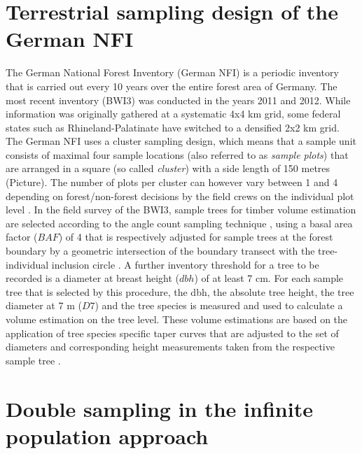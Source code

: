 

\section{Terrestrial sampling design of the German NFI}
\label{sec:germanNFI}

The German National Forest Inventory (German NFI) is a periodic inventory that is carried out every 10 years over the entire forest area of Germany. The most recent inventory (BWI3) was conducted in the years 2011 and 2012. While information was originally gathered at a systematic 4x4 km grid, some federal states such as Rhineland-Palatinate have switched to a densified 2x2 km grid. The German NFI uses a cluster sampling design, which means that a sample unit consists of maximal four sample locations (also referred to as \textit{sample plots}) that are arranged in a square (so called \textit{cluster}) with a side length of 150 metres (Picture). The number of plots per cluster can however vary between 1 and 4 depending on forest/non-forest decisions by the field crews on the individual plot level \citep{bwi3_aufn}. In the field survey of the BWI3, sample trees for timber volume estimation are selected according to the angle count sampling technique \citep{bitterlich1984}, using a basal area factor ($BAF$) of 4 that is respectively adjusted for sample trees at the forest boundary by a geometric intersection of the boundary transect with the tree-individual inclusion circle \citep{bwi3_aufn}. A further inventory threshold for a tree to be recorded is a diameter at breast height ($dbh$) of at least 7 cm. For each sample tree that is selected by this procedure, the dbh, the absolute tree height, the tree diameter at 7 m ($D7$) and the tree species is measured and used to calculate a volume estimation on the tree level. These volume estimations are based on the application of tree species specific taper curves that are adjusted to the set of diameters and corresponding height measurements taken from the respective sample tree \citep{kublin2013}.

\section{Double sampling in the infinite population approach}
\label{sec:inf_pop}


